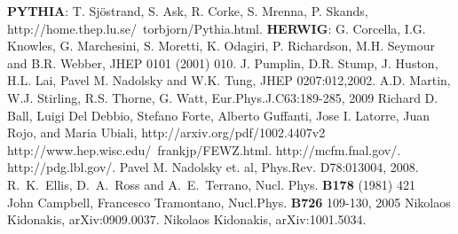 \documentclass{cmspaper_pdf}
\begin{document}
\begin{thebibliography}{9}

 \textbf{PYTHIA}: T. Sj\"ostrand, S. Ask, R. Corke, S. Mrenna, 
P. Skands, http://home.thep.lu.se/~torbjorn/Pythia.html.
 \textbf{HERWIG}: G. Corcella, I.G. Knowles, G. Marchesini, 
S. Moretti, K. Odagiri, P. Richardson, M.H. Seymour and B.R. Webber, 
JHEP 0101 (2001) 010.
 J. Pumplin, D.R. Stump, J. Huston, H.L. Lai, 
Pavel M. Nadolsky and W.K. Tung, JHEP 0207:012,2002. 
 A.D. Martin, W.J. Stirling, R.S. Thorne, G. Watt, Eur.Phys.J.C63:189-285, 2009
 Richard D. Ball, Luigi Del Debbio, Stefano Forte, Alberto Guffanti, Jose I. Latorre, Juan Rojo, and Maria Ubiali, http://arxiv.org/pdf/1002.4407v2
http://www.hep.wisc.edu/~frankjp/FEWZ.html.
http://mcfm.fnal.gov/.
http://pdg.lbl.gov/.
 Pavel M. Nadolsky et. al, Phys.Rev. D78:013004, 2008. 
 R.~K.~Ellis, D.~A.~Ross and A.~E.~Terrano, Nucl. Phys. {\bf B178} (1981) 421 \\
John Campbell, Francesco Tramontano, Nucl.Phys. {\bf B726} 109-130, 2005
 Nikolaos Kidonakis, arXiv:0909.0037.
 Nikolaos Kidonakis, arXiv:1001.5034.

 
\end{thebibliography}
\end{document}
